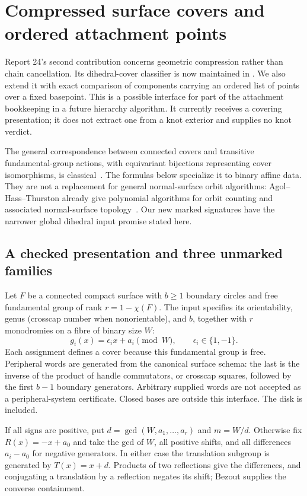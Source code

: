 \section{Compressed surface covers and ordered attachment points}
\label{sec:surface-covers}

Report 24's second contribution concerns geometric compression rather than
chain cancellation.  Its dihedral-cover classifier is now maintained in
.  We also extend it with exact comparison of
components carrying an ordered list of points over a fixed basepoint.
This is a possible interface for part of the attachment bookkeeping in a
future hierarchy algorithm.  It currently receives a covering presentation;
it does not extract one from a knot exterior and supplies no knot verdict.

The general correspondence between connected covers and transitive
fundamental-group actions, with equivariant bijections representing cover
isomorphisms, is classical~\cite[Section 1.3]{hatcher-covering}.  The formulas
below specialize it to binary affine data.  They are not a replacement for
general normal-surface orbit algorithms: Agol--Hass--Thurston already give
polynomial algorithms for orbit counting and associated normal-surface
topology~\cite{aht-orbits}.  Our new marked signatures have the narrower
global dihedral input promise stated here.

\subsection{A checked presentation and three unmarked families}

Let $F$ be a connected compact surface with $b\ge1$ boundary circles and
free fundamental group of rank $r=1-\chi(F)$.  The input specifies its
orientability, genus (crosscap number when nonorientable), and $b$, together
with $r$ monodromies on a fibre of binary size $W$:
\[
 g_i(x)=\epsilon_i x+a_i\pmod W,\qquad \epsilon_i\in\{1,-1\}.
\]
Each assignment defines a cover because this fundamental group is free.
Peripheral words are generated from the canonical surface schema: the
last is the inverse of the product of handle commutators, or crosscap
squares, followed by the first $b-1$ boundary generators.  Arbitrary supplied
words are not accepted as a peripheral-system certificate.  Closed bases
are outside this interface.  The disk is included.

If all signs are positive, put $d=\gcd(W,a_1,\ldots,a_r)$ and $m=W/d$.
Otherwise fix $R(x)=-x+a_0$ and take the gcd of $W$, all positive shifts,
and all differences $a_i-a_0$ for negative generators.  In either case
the translation subgroup is generated by $T(x)=x+d$.  Products of two
reflections give the differences, and conjugating a translation by a
reflection negates its shift; Bezout supplies the converse containment.

